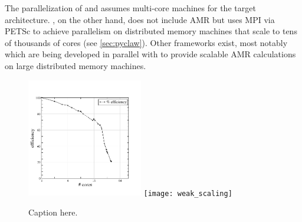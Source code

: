 The parallelization of \amrclaw and \geoclaw assumes multi-core machines for the
target architecture.  \pyclaw, on the other hand, does not include AMR but uses
MPI via PETSc to achieve parallelism on distributed memory machines that scale
to tens of thousands of cores (see \cref{sec:pyclaw}). Other frameworks exist,
most notably \forestclaw \cite{Burstedde:we} which are being developed in
parallel with \amrclaw to provide scalable AMR calculations on large distributed
memory machines. 

\begin{figure}[h]
    \centering
    \includegraphics[width=0.45\textwidth]{efficiency}
    \texttt{[image: weak\_scaling]}
    \caption{Caption here. }
    \label{fig:figure1}
\end{figure}
